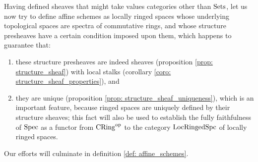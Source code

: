             Having defined sheaves that might take values categories other than $\mathrm{Sets}$, let us now try to define affine schemes as locally ringed spaces whose underlying topological spaces are spectra of commutative rings, and whose structure presheaves have a certain condition imposed upon them, which happens to guarantee that:
                \begin{enumerate}
                    \item these structure presheaves are indeed sheaves (proposition \ref{prop: structure_sheaf}) with local stalks (corollary \ref{coro: structure_sheaf_properties}), and
                    \item they are unique (proposition \ref{prop: structure_sheaf_uniqueness}), which is an important feature, because ringed spaces are uniquely defined by their structure sheaves; this fact will also be used to establish the fully faithfulness of $\operatorname{Spec}$ as a functor from $\mathrm{CRing}^{\mathrm{op}}$ to the category $\mathrm{Loc}\mathrm{Ringed}\mathrm{Spc}$ of locally ringed spaces. 
                \end{enumerate}
            Our efforts will culminate in definition \ref{def: affine_schemes}.
                
